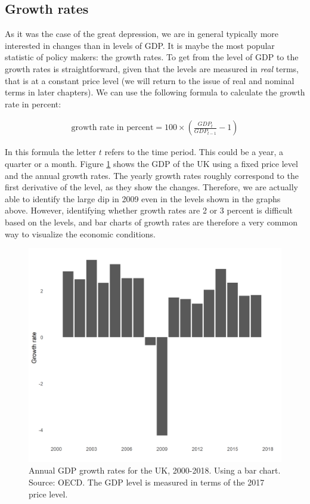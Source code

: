\documentclass[]{book}
\begin{document}
\hypertarget{growth-rates}{%
\subsection{Growth rates}\label{growth-rates}}

As it was the case of the great depression, we are in general typically more interested in changes than in levels of GDP. It is maybe the most popular statistic of policy makers: the growth rates. To get from the level of GDP to the growth rates is straightforward, given that the levels are measured in \emph{real} terms, that is at a constant price level (we will return to the issue of real and nominal terms in later chapters). We can use the following formula to calculate the growth rate in percent:

\begin{align}
\text{growth rate in percent}=100\times \left(\frac{GDP_t}{GDP_{t-1}}-1\right)
\end{align}

In this formula the letter \(t\) refers to the time period. This could be a year, a quarter or a month. Figure \ref{fig:gdp13} shows the GDP of the UK using a fixed price level and the annual growth rates. The yearly growth rates roughly correspond to the first derivative of the level, as they show the changes. Therefore, we are actually able to identify the large dip in 2009 even in the levels shown in the graphs above. However, identifying whether growth rates are 2 or 3 percent is difficult based on the levels, and bar charts of growth rates are therefore a very common way to visualize the economic conditions.

\begin{figure}

{\centering \includegraphics[width=0.8\linewidth]{_resources/chapter_gdp/fig10} 

}

\caption{Annual GDP growth rates for the UK, 2000-2018. Using a bar  chart. Source: OECD. The GDP level is measured in terms of the 2017 price level.}\label{fig:gdp13}
\end{figure}
\end{document}
